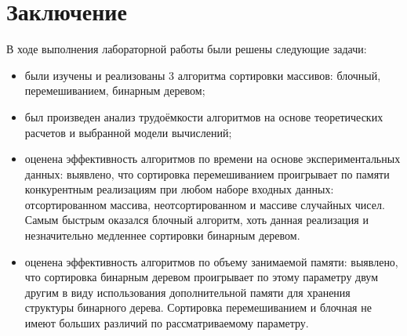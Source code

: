 \chapter*{Заключение}


В ходе выполнения лабораторной работы были решены следующие задачи:

\begin{itemize}
	\item были изучены и реализованы 3 алгоритма сортировки массивов: блочный, перемешиванием, бинарным деревом;
	\item был произведен анализ трудоёмкости алгоритмов на основе теоретических расчетов и выбранной модели вычислений;
	\item оценена эффективность алгоритмов по времени на основе экспериментальных данных: выявлено, что сортировка перемешиванием проигрывает по памяти конкурентным реализациям при любом наборе входных данных: отсортированном массива, неотсортированном и массиве случайных чисел. Самым быстрым оказался блочный алгоритм, хоть данная реализация и незначительно медленнее сортировки бинарным деревом.
	\item оценена эффективность алгоритмов по объему занимаемой памяти: выявлено, что сортировка бинарным деревом проигрывает по этому параметру двум другим в виду использования дополнительной памяти для хранения структуры бинарного дерева. Сортировка перемешиванием и блочная не имеют больших различий по рассматриваемому параметру. 
\end{itemize}
